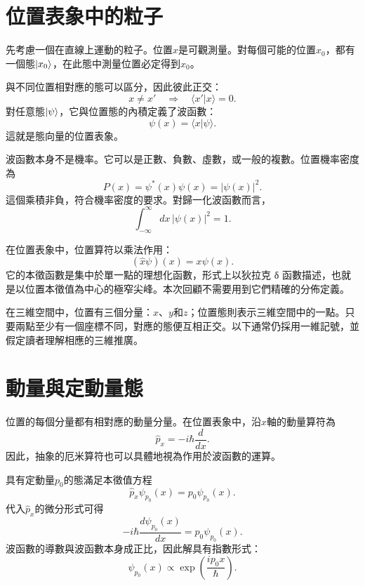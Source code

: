 \section{位置表象中的粒子}

先考慮一個在直線上運動的粒子。位置\(x\)是可觀測量。對每個可能的位置\(x_0\)，都有一個態\(\left\lvert x_0\right\rangle\)，在此態中測量位置必定得到\(x_0\)。

與不同位置相對應的態可以區分，因此彼此正交：
\begin{equation}
x\neq x'
\quad\Longrightarrow\quad
\langle x'|x\rangle=0.
\end{equation}
對任意態\(\left\lvert\psi\right\rangle\)，它與位置態的內積定義了波函數：
\begin{equation}
\psi(x)=\langle x|\psi\rangle.
\end{equation}
這就是態向量的位置表象。

波函數本身不是機率。它可以是正數、負數、虛數，或一般的複數。位置機率密度為
\begin{equation}
P(x)=\psi^*(x)\psi(x)=|\psi(x)|^2.
\end{equation}
這個乘積非負，符合機率密度的要求。對歸一化波函數而言，
\begin{equation}
\int_{-\infty}^{\infty}dx\,|\psi(x)|^2=1.
\end{equation}

在位置表象中，位置算符以乘法作用：
\begin{equation}
(\hat x\psi)(x)=x\psi(x).
\end{equation}
它的本徵函數是集中於單一點的理想化函數，形式上以狄拉克 {\proseunicodefont δ} 函數描述，也就是以位置本徵值為中心的極窄尖峰。本次回顧不需要用到它們精確的分佈定義。

在三維空間中，位置有三個分量：\(x\)、\(y\)和\(z\)；位置態則表示三維空間中的一點。只要兩點至少有一個座標不同，對應的態便互相正交。以下通常仍採用一維記號，並假定讀者理解相應的三維推廣。

\section{動量與定動量態}

位置的每個分量都有相對應的動量分量。在位置表象中，沿\(x\)軸的動量算符為
\begin{equation}
\hat p_x=-i\hbar\frac{d}{dx}.
\end{equation}
因此，抽象的厄米算符也可以具體地視為作用於波函數的運算。

具有定動量\(p_0\)的態滿足本徵值方程
\begin{equation}
\hat p_x\psi_{p_0}(x)=p_0\psi_{p_0}(x).
\end{equation}
代入\(\hat p_x\)的微分形式可得
\begin{equation}
-i\hbar\frac{d\psi_{p_0}(x)}{dx}
=p_0\psi_{p_0}(x).
\end{equation}
波函數的導數與波函數本身成正比，因此解具有指數形式：
\begin{equation}
\psi_{p_0}(x)\propto
\exp\left(\frac{ip_0x}{\hbar}\right).
\end{equation}

